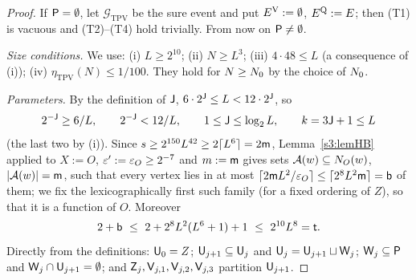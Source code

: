 \begin{proof}
If $\mathsf{P}=\emptyset$, let $\mathcal G_{\mathrm{TPV}}$ be the sure event and put $E^{\mathrm{V}}:=\emptyset$, $E^{\mathrm{Q}}:=E$; then
(T1) is vacuous and (T2)--(T4) hold trivially. From now on $\mathsf{P}\ne\emptyset$.

\emph{Size conditions.} We use: (i) $L\ge2^{10}$; (ii) $N\ge L^3$; (iii) $4\cdot48\le L$ (a consequence of (i)); (iv)
$\eta_{\mathrm{TPV}}(N)\le1/100$. They hold for $N\ge N_{0}$ by the choice of $N_{0}$.

\emph{Parameters.} By the definition of $\mathsf{J}$, $6\cdot2^{\mathsf{J}}\le L<12\cdot2^{\mathsf{J}}$, so
\begin{equation}\label{s4:eqTPVJ}
2^{-\mathsf{J}}\ge 6/L,\qquad 2^{-\mathsf{J}}<12/L,\qquad 1\le\mathsf{J}\le\log_2L,\qquad k=3\mathsf{J}+1\le L
\end{equation}
(the last two by (i)). Since $s\ge2^{150}L^{42}\ge2\lceil L^6\rceil=2\mathsf{m}$, Lemma~\ref{s3:lemHB} applied to $X:=O$,
$\varepsilon':=\varepsilon_O\ge2^{-7}$ and $m:=\mathsf{m}$ gives sets $\mathcal{A}(w)\subseteq N_O(w)$, $|\mathcal{A}(w)|=\mathsf{m}$, such that every vertex lies in
at most $\lceil2\mathsf{m} L^2/\varepsilon_O\rceil\le\lceil2^8L^2\mathsf{m}\rceil=\mathsf{b}$ of them; we fix the lexicographically first such
family (for a fixed ordering of $Z$), so that it is a function of $O$. Moreover
\begin{equation}\label{s4:eqTPVt}
2+\mathsf{b}\ \le\ 2+2^8L^2(L^6+1)+1\ \le\ 2^{10}L^8=\mathsf{t} .
\end{equation}
Directly from the definitions: $\mathsf{U}_0=Z$; $\mathsf{U}_{j+1}\subseteq\mathsf{U}_j$ and $\mathsf{U}_j=\mathsf{U}_{j+1}\sqcup\mathsf{W}_j$;
$\mathsf{W}_j\subseteq\mathsf{P}$ and $\mathsf{W}_j\cap\mathsf{U}_{j+1}=\emptyset$; and $\mathsf{Z}_j,\mathsf{V}_{j,1},\mathsf{V}_{j,2},\mathsf{V}_{j,3}$ partition
$\mathsf{U}_{j+1}$.


\end{proof}
